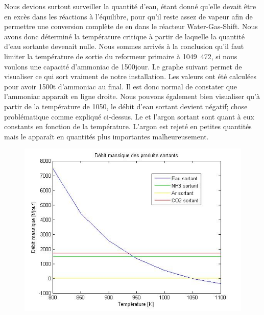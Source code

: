 \newpage
Nous devions surtout surveiller la quantité d'eau, étant donné qu'elle devait être en excès dans les réactions à
l'équilibre, pour qu'il reste assez de vapeur afin de permettre une conversion complète de  en  dans le
réacteur Water-Gas-Shift.
Nous avons donc déterminé la température critique à partir de laquelle la quantité d'eau sortante devenait nulle.
Nous sommes arrivés à la conclusion qu'il faut limiter la température de sortie du reformeur primaire à
\unit{1049.472}{\kelvin}, si nous voulons une capacité d'ammoniac de \unit{1500}{\ton\per jour}.
Le graphe suivant permet de visualiser ce qui sort vraiment de notre installation. Les valeurs ont été calculées pour
avoir 1500t d'ammoniac au final. Il est donc normal de constater que l'ammoniac apparaît en ligne droite.
Nous pouvons également bien visualiser qu'à partir de la température de \unit{1050}{\kelvin}, le débit d'eau sortant devient
négatif; chose problématique comme expliqué ci-dessus.
Le  et l'argon sortant sont quant à eux constants en fonction de la température. L'argon est rejeté en petites quantités mais le 
apparaît en quantités plus importantes malheureusement.
\begin{figure}[ht!]
\centering
\includegraphics[scale=0.6]{produits.jpg}
\label{produits_sortants}
\end{figure}
